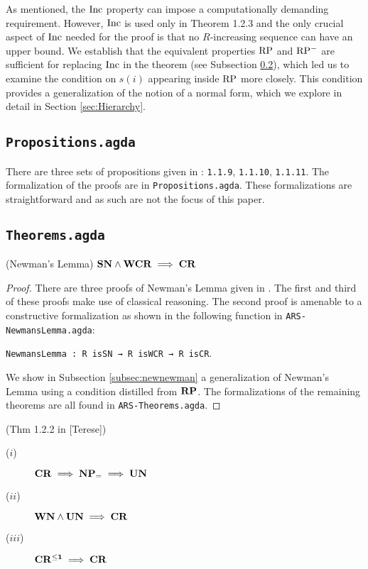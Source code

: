 As mentioned, the $\mathrm{Inc}$ property can impose a computationally demanding requirement. However, $\mathrm{Inc}$ is used only in Theorem 1.2.3
and the only crucial aspect of $\mathrm{Inc}$ needed for the proof is that no $R$-increasing
sequence can have an upper bound.
We establish that the equivalent properties $\mathrm{RP}$ and $\mathrm{RP^{-}}$ are sufficient for replacing $\mathrm{Inc}$ in the theorem (see Subsection \ref{subsec:theorems}),
which led us to examine the condition on $s (i)$ appearing inside $\mathrm{RP}$ more closely. This condition provides a generalization of the notion of a normal form,
which we explore in detail in Section \ref{sec:Hierarchy}.

\subsection{\texttt{Propositions.agda}}
There are three sets of propositions given in \terese: \texttt{1.1.9}, \texttt{1.1.10}, \texttt{1.1.11}.
The formalization of the proofs are in \texttt{Propositions.agda}. These formalizations are straightforward
and as such are not the focus of this paper.

\subsection{\texttt{Theorems.agda}} \label{subsec:theorems}

\begin{theorem}(Newman's Lemma)
  $\mathbf{SN} \land \mathbf{WCR} \implies \mathbf{CR}$
\end{theorem}

\begin{proof}
  There are three proofs of Newman's Lemma given in \terese.
  The first and third of these proofs make use of classical reasoning. The second proof is amenable to a
  constructive formalization as shown in the following function in \texttt{ARS-NewmansLemma.agda}:

  \verb|NewmansLemma : R isSN → R isWCR → R isCR|.

  We show in Subsection \ref{subsec:newnewman} a generalization of Newman's Lemma using a condition distilled from $\mathbf{RP}$.
  The formalizations of the remaining theorems are all found in \texttt{ARS-Theorems.agda}.
\end{proof}

\begin{theorem}(Thm 1.2.2 in [Terese])
\begin{description}
  \item[($i$)] $\mathbf{CR} \implies \mathbf{NP_=} \implies \mathbf{UN}$
  \item[($ii$)] $\mathbf{WN} \land \mathbf{UN} \implies \mathbf{CR}$
  \item[($iii$)] $\mathbf{CR^{\le 1}} \implies \mathbf{CR}$
\end{description}
\end{theorem}

